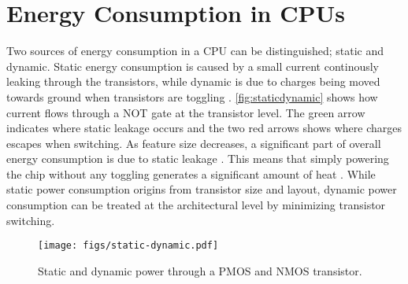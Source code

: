 \section{Energy Consumption in CPUs}

Two sources of energy consumption in a CPU can be distinguished; static and
dynamic. Static energy consumption is caused by a small current continously
leaking through the transistors, while dynamic is due to charges being moved
towards ground when transistors are toggling \cite{wolf}.
\autoref{fig:staticdynamic} shows how current flows through a NOT gate at the
transistor level. The green arrow indicates where static leakage occurs and the
two red arrows shows where charges escapes when switching. As feature size
decreases, a significant part of overall energy consumption is due to static
leakage \cite{nguyen2003minimization}. This means that simply powering the chip
without any toggling generates a significant amount of heat
\cite{kim2003leakage,martin2002combined}. While static power consumption origins
from transistor size and layout, dynamic power consumption can be treated at the
architectural level by minimizing transistor switching.

\begin{figure}[tbh]
    \centering
    \texttt{[image: figs/static-dynamic.pdf]}
    \caption{Static and dynamic power through a PMOS and NMOS transistor.}
    \label{fig:staticdynamic}
\end{figure}
